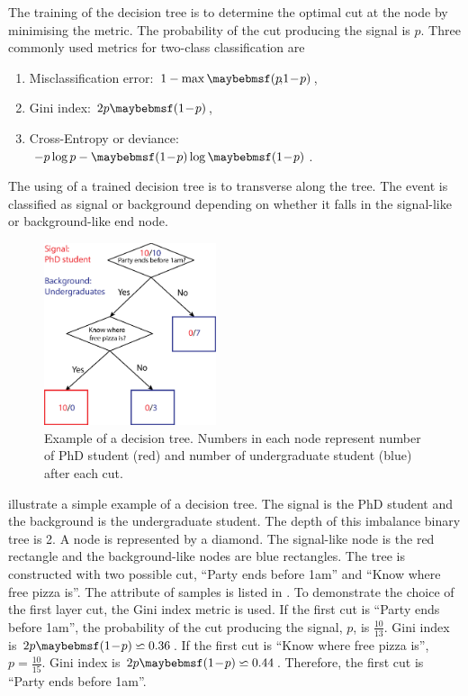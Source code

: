 The training of the decision tree is to determine the optimal cut at the node by minimising the metric. The probability of the cut producing the signal is $p$. Three commonly used metrics for two-class classification are
\begin{enumerate}
\item Misclassification error:  $1 - \max\parenths{p\!,\!1\!-\!p}$,
\item Gini index: $2p\parenths{1\!-\!p}$,
\item Cross-Entropy or deviance: $-p\log{p}-\parenths{1\!-\!p}\log\parenths{1\!-\!p}$.
\end{enumerate}

The using of a trained decision tree is to transverse along the tree. The event is classified as signal or background depending on whether it falls in the signal-like or background-like end node.

\begin{figure}[!tbp]
\includegraphics[width=0.45\textwidth]{doubleHiggs/mva/BDTcomic}
\caption[Example of a decision tree. ]
{Example of a decision tree. Numbers in each node represent number of PhD student (red) and number of undergraduate student (blue) after each cut.}
   \label{fig:doubleHiggsMVAdecisionTree}
\end{figure}

 illustrate a simple example of a decision tree. The signal is the PhD student and the background is the undergraduate student. The depth of this imbalance binary  tree is 2. A node is represented by a diamond.  The signal-like node is the red rectangle and the background-like nodes are blue rectangles. The tree is constructed with two possible cut, ``Party ends before 1am'' and ``Know where free pizza is''. The attribute of samples is listed in . To demonstrate the choice of the first layer cut, the Gini index metric is used. If the first cut is ``Party ends before 1am'', the probability of the cut producing the signal, $p$, is $\frac{10}{13}$. Gini index is $2p\parenths{1\!-\!p} \backsimeq 0.36 $. If the first cut is ``Know where free pizza is'', $p=\frac{10}{15}$. Gini index is $2p\parenths{1\!-\!p} \backsimeq 0.44 $. Therefore, the first cut is ``Party ends before 1am''.

